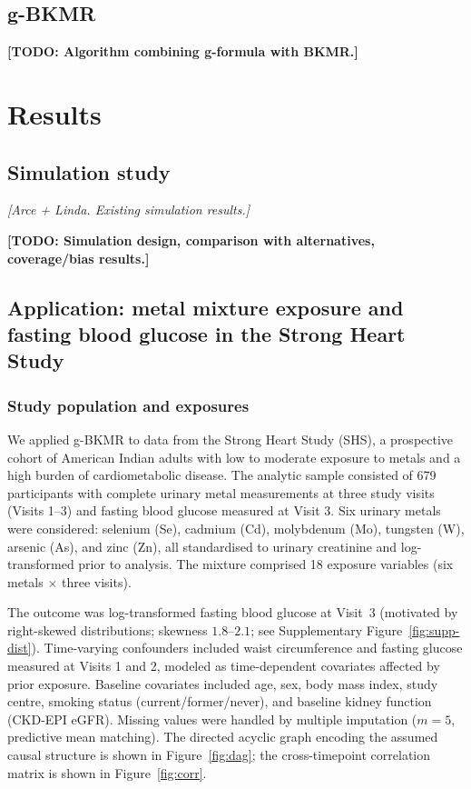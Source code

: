 \documentclass[11pt]{article}
\newcommand{\todo}[1]{{\color{red}\textbf{[TODO: #1]}}}
\newcommand{\note}[1]{{\color{purple}\textit{[#1]}}}
\begin{document}
\subsection{g-BKMR}
\todo{Algorithm combining g-formula with BKMR.}

\section{Results}
\label{sec:results}

\subsection{Simulation study}
\label{sec:simulation}

\note{Arce + Linda. Existing simulation results.}

\todo{Simulation design, comparison with alternatives, coverage/bias results.}


\subsection{Application: metal mixture exposure and fasting blood glucose in the Strong Heart Study}
\label{sec:application}

\subsubsection{Study population and exposures}

We applied g-BKMR to data from the Strong Heart Study (SHS), a prospective cohort of American Indian adults with low to moderate exposure to metals and a high burden of cardiometabolic disease. The analytic sample consisted of 679 participants with complete urinary metal measurements at three study visits (Visits 1--3) and fasting blood glucose measured at Visit 3. Six urinary metals were considered: selenium (Se), cadmium (Cd), molybdenum (Mo), tungsten (W), arsenic (As), and zinc (Zn), all standardised to urinary creatinine and log-transformed prior to analysis. The mixture comprised 18 exposure variables (six metals $\times$ three visits).

The outcome was log-transformed fasting blood glucose at Visit~3 (motivated by right-skewed distributions; skewness $1.8$--$2.1$; see Supplementary Figure~\ref{fig:supp-dist}). Time-varying confounders included waist circumference and fasting glucose measured at Visits 1 and 2, modeled as time-dependent covariates affected by prior exposure. Baseline covariates included age, sex, body mass index, study centre, smoking status (current/former/never), and baseline kidney function (CKD-EPI eGFR). Missing values were handled by multiple imputation ($m = 5$, predictive mean matching). The directed acyclic graph encoding the assumed causal structure is shown in Figure~\ref{fig:dag}; the cross-timepoint correlation matrix is shown in Figure~\ref{fig:corr}.
\end{document}
